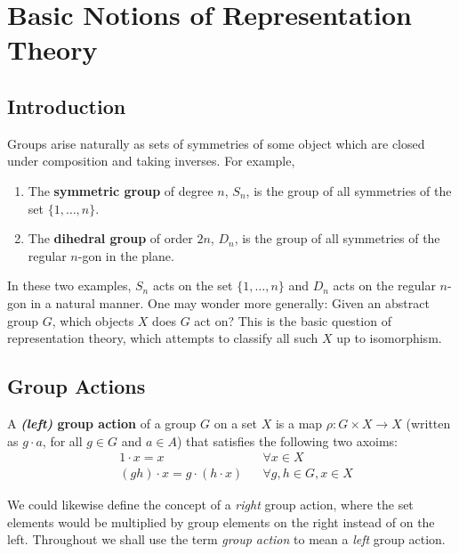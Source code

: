 
\chapter{Basic Notions of Representation Theory} %




\section{Introduction}
Groups arise naturally as sets of symmetries of some object which are closed under composition and taking inverses.  For example, 
\begin{enumerate}
\item The \textbf{symmetric group} of degree $n$, $S_n$, is the group of all symmetries of the set $\{ 1, \ldots, n \}$.
\item The \textbf{dihedral group} of order $2n$, $D_{n}$, is the group of all symmetries of the regular $n$-gon in the plane.
\end{enumerate}
In these two examples, $S_n$  acts on the set $\{ 1, \ldots, n \}$ and $D_{n}$ acts on the regular $n$-gon in a natural manner. One may wonder more generally:  Given an abstract group $G$, which objects $X$ does $G$ act on?
This is the basic question of representation theory, which attempts to classify all such $X$ up to isomorphism.

%
\section {Group Actions}
\begin{defn}\label{def-grp-action}
A  \textbf{\textit{(left)} group action} of a group $G$ on a set $X$ is a map $\rho \colon G \times X \to X$ (written as $g \cdot a$, for all $g \in G$ and $a \in A$) that satisfies the following two axoims:
\begin{align}
\label{grp-action-axiom-1}&1 \cdot  x = x && \forall x \in X\\
\label{grp-action-axiom-2}&(gh) \cdot x  = g \cdot (h \cdot x) && \forall g,h \in G, x \in X
\end{align}
\end{defn}
\begin{note}
We could likewise define the concept of a \textit{right} group action, where the set elements would be multiplied by group elements on the right instead of on the left.  Throughout we shall use the term \textit{group action} to mean a \textit{left} group action.
\end{note}


